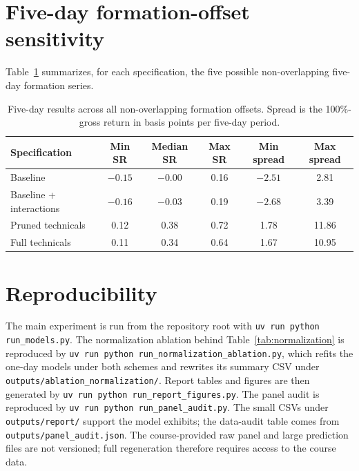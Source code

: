 \documentclass[11pt]{article}
\begin{document}
\section{Five-day formation-offset sensitivity}
\label{app:offset}

Table~\ref{tab:offsets} summarizes, for each specification, the five
possible non-overlapping five-day formation series.

\begin{table}[ht]
\centering
\caption{Five-day results across all non-overlapping formation offsets.
Spread is the 100\%-gross return in basis points per five-day period.}
\label{tab:offsets}
\small
\begin{tabular}{@{}lccccc@{}}
\toprule
Specification & Min SR & Median SR & Max SR & Min spread & Max spread \\
\midrule
Baseline & $-0.15$ & $-0.00$ & 0.16 & $-2.51$ & 2.81 \\
Baseline + interactions & $-0.16$ & $-0.03$ & 0.19 & $-2.68$ & 3.39 \\
Pruned technicals & 0.12 & 0.38 & 0.72 & 1.78 & 11.86 \\
Full technicals & 0.11 & 0.34 & 0.64 & 1.67 & 10.95 \\
\bottomrule
\end{tabular}
\end{table}

\FloatBarrier
\section{Reproducibility}

\begin{sloppypar}
The main experiment is run from the repository root with
\texttt{uv run python run\_models.py}. The normalization ablation behind
Table~\ref{tab:normalization} is reproduced by
\texttt{uv run python run\_normalization\_ablation.py}, which refits the
one-day models under both schemes and rewrites its summary CSV under
\texttt{outputs/ablation\_normalization/}. Report tables and figures are
then generated by \texttt{uv run python run\_report\_figures.py}. The panel
audit is reproduced by \texttt{uv run python run\_panel\_audit.py}. The
small CSVs under \texttt{outputs/report/} support the model exhibits; the
data-audit table comes from \texttt{outputs/panel\_audit.json}. The
course-provided raw panel and large prediction files are not versioned; full
regeneration therefore requires access to the course data.
\end{sloppypar}
\end{document}

